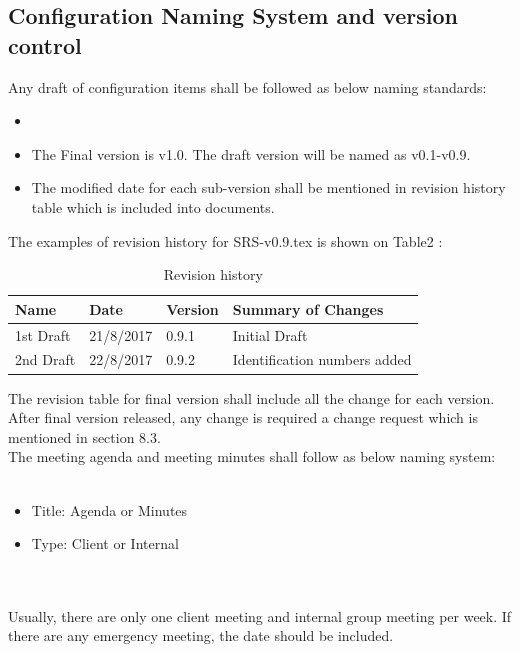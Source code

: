 \subsection{Configuration Naming System and version control}
Any draft of configuration items shall be followed as below naming standards:
\begin{itemize}
\item \texttt{}\\
      \texttt{}
\item The Final version is v1.0. The draft version will be named as v0.1-v0.9.
\item The modified date for each sub-version shall be mentioned in revision history table which is included into documents.\\
\end{itemize}

The examples of revision history for SRS-v0.9.tex is shown on Table2 :\\

\begin{table}[]
	\centering
	\caption{Revision history}
	\label{my-label}
	\begin{tabular}{|l|l|l|l|}
		\hline
		Name      & Date      & Version & Summary of Changes           \\ \hline
		1st Draft & 21/8/2017 & 0.9.1   & Initial Draft                \\ \hline
		2nd Draft & 22/8/2017 & 0.9.2   & Identification numbers added \\ \hline
	\end{tabular}
\end{table}


The revision table for final version shall include all the change for each version. After final version released, any change is required a change request which is mentioned in section 8.3.\\


The meeting agenda and meeting minutes shall follow as below naming system:\\
\texttt{}\\
\begin{itemize}
\item Title: Agenda or Minutes
\item Type: Client or Internal
\end{itemize}
\texttt{} \\\\
Usually, there are only one client meeting and internal group meeting per week. If there are any emergency meeting, the date should be included.\\\\
\texttt{}\\
\texttt{}\\
